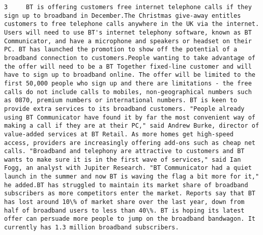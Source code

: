 \documentclass[11pt]{article}
\begin{document}
\begin{Verbatim}[commandchars=\\\{\}]
         3     BT is offering customers free internet telephone calls if they sign up to broadband in December.The Christmas give-away entitles customers to free telephone calls anywhere in the UK via the internet. Users will need to use BT's internet telephony software, known as BT Communicator, and have a microphone and speakers or headset on their PC. BT has launched the promotion to show off the potential of a broadband connection to customers.People wanting to take advantage of the offer will need to be a BT Together fixed-line customer and will have to sign up to broadband online. The offer will be limited to the first 50,000 people who sign up and there are limitations - the free calls do not include calls to mobiles, non-geographical numbers such as 0870, premium numbers or international numbers. BT is keen to provide extra services to its broadband customers. "People already using BT Communicator have found it by far the most convenient way of making a call if they are at their PC," said Andrew Burke, director of value-added services at BT Retail. As more homes get high-speed access, providers are increasingly offering add-ons such as cheap net calls. "Broadband and telephony are attractive to customers and BT wants to make sure it is in the first wave of services," said Ian Fogg, an analyst with Jupiter Research. "BT Communicator had a quiet launch in the summer and now BT is waving the flag a bit more for it," he added.BT has struggled to maintain its market share of broadband subscribers as more competitors enter the market. Reports say that BT has lost around 10\% of market share over the last year, down from half of broadband users to less than 40\%. BT is hoping its latest offer can persuade more people to jump on the broadband bandwagon. It currently has 1.3 million broadband subscribers.                                                                                                                                                                                                                                                                                                                                                                                                                                                                                                                                                                                                                                                                                                                                                                                                                                                                                                                                                                                                                                                                                                                                                                                                                                                                                                                                                                                                                                                                                                                       
\end{Verbatim}
\end{document}
